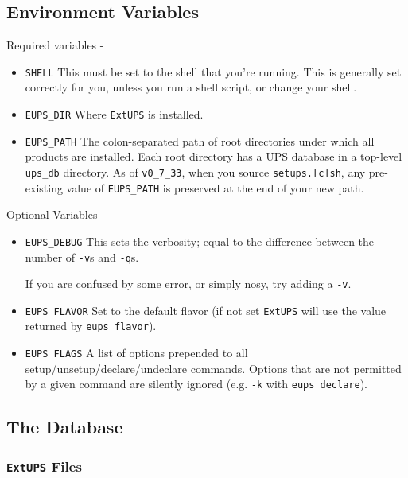 \documentclass{article}
\newcommand{\code}[1]{\texttt{#1}}
\newcommand{\eups}{\code{ExtUPS}}
\begin{document}
\subsection{Environment Variables}

Required variables -

\begin{itemize}
  \item \code{SHELL}
    This must be set to the shell that you're running. This is
    generally set correctly for you, unless you run a shell script, or
    change your shell.

  \item \code{EUPS\_DIR}
    Where \eups{} is installed.

  \item \code{EUPS\_PATH}
    The colon-separated path of root directories under which all products are installed.
    Each root directory has a UPS database in a top-level \code{ups\_db} directory.
    As of \code{v0\_7\_33}, when you source \code{setups.[c]sh}, any
    pre-existing value of \code{EUPS\_PATH} is preserved at the end of
    your new path.
\end{itemize}

Optional Variables -

\begin{itemize}
  \item \code{EUPS\_DEBUG}
    This sets the verbosity; equal to the difference between the number of \code{-v}s
    and \code{-q}s.

    If you are confused by some error, or simply nosy, try adding a \code{-v}.

  \item \code{EUPS\_FLAVOR}
    Set to the default flavor (if not set \eups{} will use the value returned
    by \code{eups flavor}).

  \item \code{EUPS\_FLAGS}
    A list of options prepended to all setup/unsetup/declare/undeclare commands. Options
    that are not permitted by a given command are silently ignored (e.g. \code{-k}
    with \code{eups declare}).
\end{itemize}

\subsection{The Database}

\subsubsection{\eups{} Files}
\end{document}
